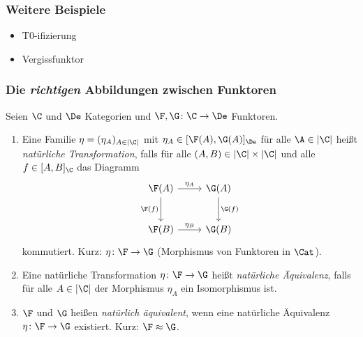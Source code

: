 \begin{frame}[fragile]
  \frametitle{Weitere Beispiele}
  \begin{itemize}
    \item T0-ifizierung
    \item Vergissfunktor
  \end{itemize}
\end{frame}

\begin{frame}[fragile]
  \frametitle{Die \emph{richtigen} Abbildungen zwischen Funktoren}
  Seien $\C$ und $\De$ Kategorien und $\F, \G \colon \C \to \De$ Funktoren.
  \begin{enumerate}[1)]
    \item<+-> Eine Familie $\eta = (\eta_A)_{A \in |\C|}$ mit $\eta_A \in [\F(A), \G(A)]_\De$ für alle $\A \in |\C|$ heißt \emph{natürliche Transformation}, falls für alle $(A,B) \in |\C| \times |\C|$ und alle $f \in [A,B]_\C$ das Diagramm
      $$
      \begin{tikzcd}[row sep=2.5em]
        \F(A)\arrow[r,"\eta_A"]\arrow[d,"\F(f)"'] & \G(A)\arrow[d,"\G(f)"] \\
        \F(B)\arrow[r,"\eta_B"] & \G(B)
      \end{tikzcd}
      $$
      kommutiert. Kurz: $\eta \colon \F \to \G$ (Morphismus von Funktoren in $\Cat$).
    \item<+-> Eine natürliche Transformation $\eta \colon \F \to \G$ heißt \emph{natürliche Äquivalenz}, falls für alle $A \in |\C|$ der Morphismus $\eta_A$ ein Isomorphismus ist.
    \item<+-> $\F$ und $\G$ heißen \emph{natürlich äquivalent},  wenn eine natürliche Äquivalenz $\eta \colon \F \to \G$ existiert. Kurz: $\F \approx \G$.
  \end{enumerate}
\end{frame}

